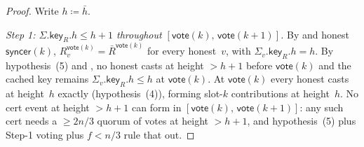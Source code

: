 \ifx\litemode\undefined\documentclass{article}\fi
\newcommand{\key}{\mathsf{key}}
\newcommand{\syncer}{\mathsf{syncer}}
\newcommand{\vote}{\mathsf{vote}}
\newcommand{\comm}[1]{\bar{#1}}
\theoremstyle{plain}
\theoremstyle{definition}
\theoremstyle{remark}
\begin{document}
\begin{proof}
Write $h \coloneqq \comm{h}$.

\emph{Step 1: $\Sigma.\key_R.h \leq h+1$ throughout $[\vote(k),\, \vote(k+1)]$.}
By  and honest $\syncer(k)$, $R_v^{\vote(k)} = \comm{R}^{\vote(k)}$ for every honest~$v$, with $\Sigma_v.\key_R.h = h$. By hypothesis~(5) and , no honest casts at height $> h+1$ before $\vote(k)$ and the cached key remains $\Sigma_v.\key_R.h \leq h$ at $\vote(k)$. At $\vote(k)$ every honest casts at height~$h$ exactly (hypothesis~(4)), forming slot-$k$ contributions at height~$h$. No cert event at height $> h+1$ can form in $[\vote(k),\, \vote(k+1)]$: any such cert needs a $\geq 2n/3$ quorum of votes at height $> h+1$, and hypothesis~(5) plus Step-1 voting plus $f < n/3$ rule that out.


\end{proof}
\end{document}
